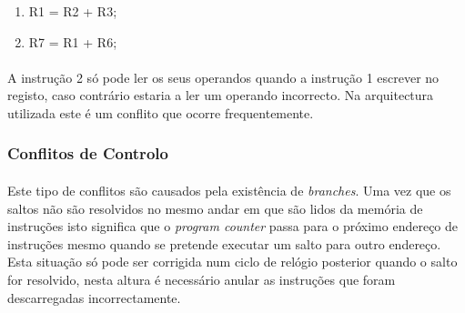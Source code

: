 \begin{enumerate}
	\item R1 = R2 + R3;
	\item R7 = R1 + R6;
\end{enumerate}

\paragraph{} A instrução 2 só pode ler os seus operandos quando a instrução 1 escrever no registo, caso contrário estaria a ler um operando incorrecto. Na arquitectura utilizada este é um conflito que ocorre frequentemente.

\subsubsection{Conflitos de Controlo}

\paragraph{} Este tipo de conflitos são causados pela existência de \textit{branches}. Uma vez que os saltos não são resolvidos no mesmo andar em que são lidos da memória de instruções isto significa que o \textit{program counter} passa para o próximo endereço de instruções mesmo quando se pretende executar um salto para outro endereço. Esta situação só pode ser corrigida num ciclo de relógio posterior quando o salto for resolvido, nesta altura é necessário anular as instruções que foram descarregadas incorrectamente.
